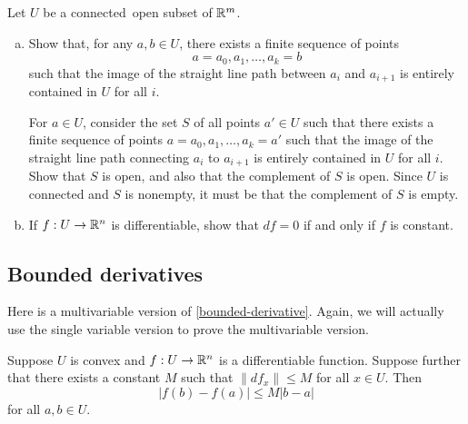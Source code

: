 \begin{exercise} \label{constant-iff-derivative-zero-connected}
	Let $U$ be a connected\footnotemark\ open subset of $\mathbb{R}^m$.
	\begin{enumerate}[(a)]
		\item Show that, for any $a, b \in U$, there exists a finite sequence of points \[ a = a_0, a_1, \dotsc, a_k = b \] such that the image of the straight line path between $a_i$ and $a_{i+1}$ is entirely contained in $U$ for all $i$. 
		
		\begin{hint}
			For $a \in U$, consider the set $S$ of all points $a' \in U$ such that there exists a finite sequence of points $a = a_0, a_1, \dotsc, a_k = a'$ such that the image of the straight line path connecting $a_i$ to $a_{i+1}$ is entirely contained in $U$ for all $i$. Show that $S$ is open, and also that the complement of $S$ is open. Since $U$ is connected and $S$ is nonempty, it must be that the complement of $S$ is empty.  
		\end{hint}
		
		\item If $f : U \to \mathbb{R}^n$ is differentiable, show that $df = 0$ if and only if $f$ is constant. 
	\end{enumerate}
\end{exercise}


\subsection{Bounded derivatives}

Here is a multivariable version of \cref{bounded-derivative}. Again, we will actually use the single variable version to prove the multivariable version. 

\begin{proposition} \label{bounded-derivative-multi}
	Suppose $U$ is convex and $f : U \to \mathbb{R}^n$ is a differentiable function. Suppose further that there exists a constant $M$ such that $\|df_x\| \leq M$ for all $x \in U$. Then
	\[ |f(b) - f(a)| \leq M |b-a| \]
	for all $a, b \in U$. 
\end{proposition}

